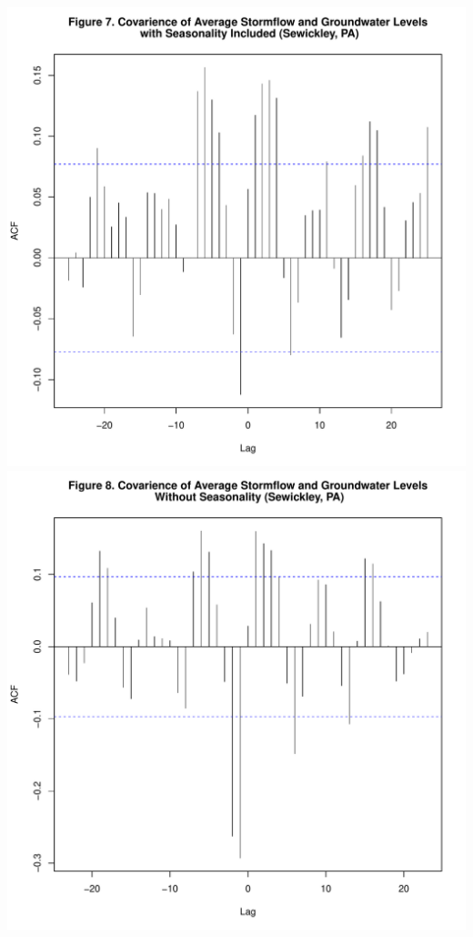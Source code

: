 \documentclass[
  12pt,
]{article}
\begin{document}
\includegraphics{Draft_Final_files/figure-latex/groundwater_lag-5.pdf}
\includegraphics{Draft_Final_files/figure-latex/groundwater_lag-6.pdf}
\newpage
\end{document}
